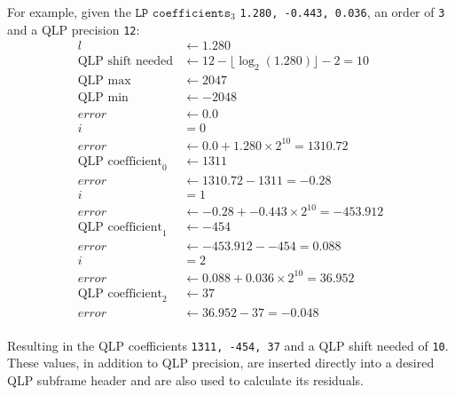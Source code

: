For example, given the $\texttt{LP coefficients}_3$ \texttt{1.280, -0.443, 0.036},
an order of \texttt{3} and a QLP precision \texttt{12}:
\begin{align*}
l &\leftarrow 1.280 \\
\text{QLP shift needed} &\leftarrow 12 - \lfloor \log_2(1.280) \rfloor - 2 = 10 \\
\text{QLP max} &\leftarrow 2047 \\
\text{QLP min} &\leftarrow -2048 \\
error &\leftarrow 0.0 \\
i &= 0 \\
error &\leftarrow 0.0 + 1.280 \times 2 ^ {10} = 1310.72 \\
\text{QLP coefficient}_0 &\leftarrow 1311 \\
error &\leftarrow 1310.72 - 1311 = -0.28 \\
i &= 1 \\
error &\leftarrow -0.28 + -0.443 \times 2 ^ {10} = -453.912 \\
\text{QLP coefficient}_1 &\leftarrow -454 \\
error &\leftarrow -453.912 - -454 = 0.088 \\
i &= 2 \\
error &\leftarrow 0.088 + 0.036 \times 2 ^ {10} = 36.952 \\
\text{QLP coefficient}_2 &\leftarrow 37 \\
error &\leftarrow 36.952 - 37 = -0.048 \\
\end{align*}
\par
\noindent
Resulting in the QLP coefficients \texttt{1311, -454, 37}
and a QLP shift needed of \texttt{10}.
These values, in addition to QLP precision,
are inserted directly into a desired QLP subframe header
and are also used to calculate its residuals.

\clearpage

